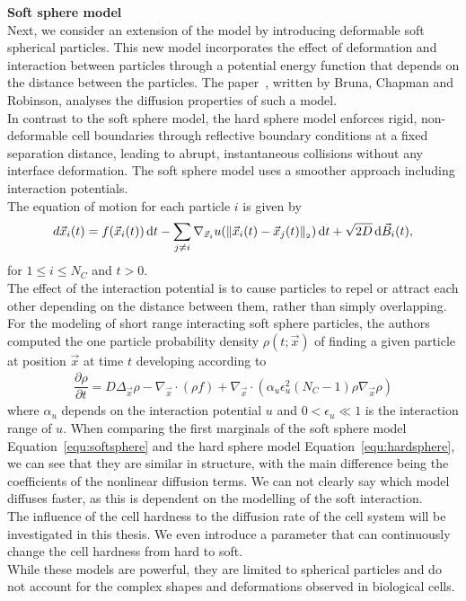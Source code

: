 \textbf{Soft sphere model} \\
Next, we consider an extension of the model by introducing deformable soft spherical particles. 
This new model incorporates the effect of deformation and interaction between particles through a potential energy function that depends on the distance between the particles.
The paper~\cite{Bruna2017}, written by Bruna, Chapman and Robinson, analyses the diffusion properties of such a model. \\
In contrast to the soft sphere model, the hard sphere model enforces rigid, non-deformable cell boundaries through reflective boundary conditions at a fixed separation distance, leading to abrupt, instantaneous collisions without any interface deformation. 
The soft sphere model uses a smoother approach including interaction potentials. \\
The equation of motion for each particle $i$ is given by
\begin{align*}
	d\vec{x}_i(t) =  f(\vec{x}_i(t))\, \dequ t - \sum\limits_{j\neq i} \nabla_{\vec{x}_i} u (\norm[ \vec{x}_i(t) - \vec{x}_j(t)])\, \dequ t + \sqrt{2D} \, \dequ \vec{B}_i(t), 
\end{align*}
for $1 \leq i \leq N_C$ and $t>0$.  \\
The effect of the interaction potential is to cause particles to repel or attract each other depending on the distance between them, rather than simply overlapping. \\
For the modeling of short range interacting soft sphere particles, the authors computed the one particle probability density $\rho(t; \vec{x})$ of finding a given particle at position $\vec{x}$ at time $t$ developing according to
\begin{align}
	\dfrac{\partial \rho}{\partial t} = D \Delta_{\vec{x}} \rho - \nabla_{\vec{x}} \cdot (\rho f)  + \nabla_{\vec{x}} \cdot (\alpha_u \epsilon_u^2(N_C-1)\rho \nabla_{\vec{x}} \rho)
	\label{equ:softsphere}
\end{align}
where $\alpha_u$ depends on the interaction potential $u$ and $0 < \epsilon_u \ll 1$ is the interaction range of $u$.
When comparing the first marginals of the soft sphere model Equation~\eqref{equ:softsphere} and the hard sphere model Equation~\eqref{equ:hardsphere}, we can see that they are similar in structure, with the main difference being the coefficients of the nonlinear diffusion terms. 
We can not clearly say which model diffuses faster, as this is dependent on the modelling of the soft interaction. \\
The influence of the cell hardness to the diffusion rate of the cell system will be investigated in this thesis. 
We even introduce a parameter that can continuously change the cell hardness from hard to soft. \\
While these models are powerful, they are limited to spherical particles and do not account for the complex shapes and deformations observed in biological cells.  \\



